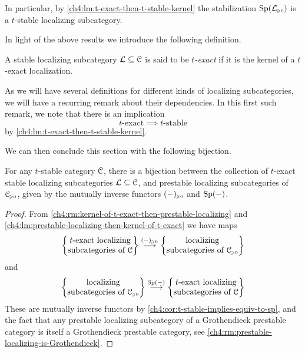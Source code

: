 \begin{remark}
    In particular, by \cref{ch4:lm:t-exact-then-t-stable-kernel} the stabilization $\mathrm{Sp}(\mathcal{L}_{\hspace{-1pt}\scriptscriptstyle\geqslant 0})$ is a $t$-stable localizing subcategory. 
\end{remark}

In light of the above results we introduce the following definition. 

\begin{definition}
    A stable localizing subcategory $\mathcal{L}\subseteq \EuScript{C}$ is said to be \emph{$t$-exact} if it is the kernel of a $t$-exact localization. 
\end{definition}

\begin{remark}
    \label{ch4:rm:recurring-1}
    As we will have several definitions for different kinds of localizing subcategories, we will have a recurring remark about their dependencies. In this first such remark, we note that there is an implication
    \[t\text{-exact}\implies t\text{-stable}\]
    by \cref{ch4:lm:t-exact-then-t-stable-kernel}. 
\end{remark}

We can then conclude this section with the following bijection. 

\begin{corollary}
    \label{ch4:cor:t-exact-corresponds-to-prestable-localizing}
    For any $t$-stable category $\EuScript{C}$, there is a bijection between the collection of $t$-exact stable localizing subcategories $\mathcal{L}\subseteq \EuScript{C}$, and prestable localizing subcategories of $\EuScript{C}_{\hspace{-1pt}\scriptscriptstyle\geqslant 0}$, given by the mutually inverse functors $(-)_{\hspace{-1pt}\scriptscriptstyle\geqslant 0}$ and $\mathrm{Sp}(-)$. 
\end{corollary}
\begin{proof}
    From \cref{ch4:rm:kernel-of-t-exact-then-prestable-localizing} and \cref{ch4:lm:prestable-localizing-then-kernel-of-t-exact} we have maps 
    \[\left\{ \begin{matrix} t\text{-exact localizing}\\ \text{subcategories of }\EuScript{C} \end{matrix} \right\}\overset{(-)_{\hspace{-1pt}\scriptscriptstyle\geqslant 0}}{\longrightarrow} \left\{ \begin{matrix} \text{localizing}\\ \text{subcategories of }\EuScript{C}_{\hspace{-1pt}\scriptscriptstyle\geqslant 0} \end{matrix} \right\}\] 
    and 
    \[\left\{ \begin{matrix} \text{localizing}\\ \text{subcategories of }\EuScript{C}_{\hspace{-1pt}\scriptscriptstyle\geqslant 0} \end{matrix} \right\}\overset{\mathrm{Sp}(-)}{\longrightarrow} \left\{ \begin{matrix} t\text{-exact localizing}\\ \text{subcategories of }\EuScript{C} \end{matrix} \right\}\] 
    These are mutually inverse functors by \cref{ch4:cor:t-stable-implies-equiv-to-sp}, and the fact that any prestable localizing subcategory of a Grothendieck prestable category is itself a Grothendieck prestable category, see \cref{ch4:rm:prestable-localizing-is-Grothendieck}. 
\end{proof}



